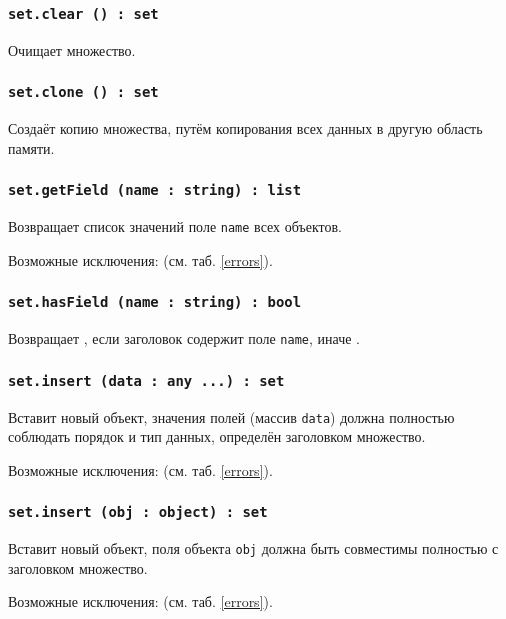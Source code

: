 \subsubsection{\texttt{set.clear () : set}}

Очищает множество.

\subsubsection{\texttt{set.clone () : set}}

Создаёт копию множества, путём копирования всех данных в другую область памяти.

\subsubsection{\texttt{set.getField (name : string) : list}}

Возвращает список значений поле \texttt{name} всех объектов.

Возможные исключения:  (см. таб. \ref{errors}).

\subsubsection{\texttt{set.hasField (name : string) : bool}}

Возвращает \true, если заголовок содержит поле \texttt{name}, иначе \false.

\subsubsection{\texttt{set.insert (data : any ...) : set}}

Вставит новый объект, значения полей (массив \texttt{data}) должна полностью соблюдать порядок и тип данных, определён заголовком множество.

Возможные исключения:  (см. таб. \ref{errors}).

\subsubsection{\texttt{set.insert (obj : object) : set}}

Вставит новый объект, поля объекта \texttt{obj} должна быть совместимы полностью с заголовком множество.

Возможные исключения:  (см. таб. \ref{errors}).

